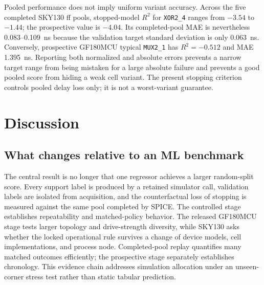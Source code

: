 \documentclass[preprint,12pt]{elsarticle}
\begin{document}
\begin{table}[H]
\centering
\caption{Pooled, tail, ranking, and worst-variant metrics at the selected budget. Values are medians across pools; P95 AE denotes the within-pool 95th percentile of absolute delay error.}
\label{tab:tail-ranking}
\end{table}

Pooled performance does not imply uniform variant accuracy. Across the five completed SKY130 ff pools, stopped-model $R^2$ for \texttt{XOR2\_4} ranges from $-3.54$ to $-1.44$; the prospective value is $-4.04$. Its completed-pool MAE is nevertheless 0.083--0.109~ns because the validation target standard deviation is only 0.063~ns. Conversely, prospective GF180MCU typical \texttt{MUX2\_1} has $R^2=-0.512$ and MAE 1.395~ns. Reporting both normalized and absolute errors prevents a narrow target range from being mistaken for a large absolute failure and prevents a good pooled score from hiding a weak cell variant. The present stopping criterion controls pooled delay loss only; it is not a worst-variant guarantee.

\section{Discussion}

\subsection{What changes relative to an ML benchmark}

The central result is no longer that one regressor achieves a larger random-split score. Every support label is produced by a retained simulator call, validation labels are isolated from acquisition, and the counterfactual loss of stopping is measured against the same pool completed by SPICE. The controlled stage establishes repeatability and matched-policy behavior. The released GF180MCU stage tests larger topology and drive-strength diversity, while SKY130 asks whether the locked operational rule survives a change of device models, cell implementations, and process node. Completed-pool replay quantifies many matched outcomes efficiently; the prospective stage separately establishes chronology. This evidence chain addresses simulation allocation under an unseen-corner stress test rather than static tabular prediction.
\end{document}
